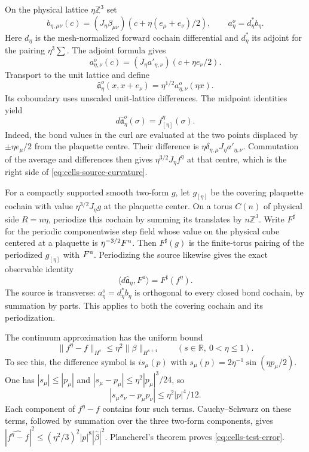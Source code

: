 \documentclass[11pt,letterpaper,reqno]{amsart}
\newcommand{\R}{\mathbb R}
\newcommand{\Z}{\mathbb Z}
\begin{document}
On the physical lattice $\eta\Z^3$ set
\[
 b_{\eta,\mu\nu}(c)
       =(J_\eta\beta_{\mu\nu})
                       (c+\eta(e_\mu+e_\nu)/2),\qquad
 a_\eta^o=d_\eta^*b_\eta.
\]
Here $d_\eta$ is the mesh-normalized forward cochain differential
and $d_\eta^*$ its adjoint for the pairing $\eta^3\sum$.
The adjoint formula gives
\begin{equation}\label{eq:cells-midpoint-source}
 a_{\eta,\nu}^o(c)=(J_\eta a'_{\eta,\nu})(c+\eta e_\nu/2).
\end{equation}
Transport to the unit lattice and define
\[
 \hat{\mathfrak a}_\eta^o(x,x+e_\nu)
                    =\eta^{1/2}a_{\eta,\nu}^o(\eta x).
\]
Its coboundary uses unscaled unit-lattice differences. The
midpoint identities yield
\begin{equation}\label{eq:cells-source-curvature}
 d\hat{\mathfrak a}_\eta^o(\sigma)
                        =f^\eta_{[\eta]}(\sigma).
\end{equation}
Indeed, the bond values in the curl are evaluated at the two
points displaced by $\pm\eta e_\mu/2$ from the plaquette centre.
Their difference is $\eta\delta_{\eta,\mu}J_\eta a'_{\eta,\nu}$.
Commutation of the average and differences then gives
$\eta^{3/2}J_\eta f^\eta$ at that centre, which is the right
side of \eqref{eq:cells-source-curvature}.

For a compactly supported smooth two-form $g$, let $g_{[\eta]}$
be the covering plaquette cochain with value $\eta^{3/2}J_\eta g$
at the plaquette center. On a torus $C(n)$ of physical side
$R=n\eta$, periodize this cochain by summing its translates by
$n\Z^3$. Write $F^\sharp$ for the periodic componentwise step
field whose value on the physical cube centered at a plaquette
is $\eta^{-3/2}F^{\rm u}$. Then $F^\sharp(g)$ is the finite-torus
pairing of the periodized $g_{[\eta]}$ with $F^{\rm u}$.
Periodizing the source likewise gives the exact observable identity
\begin{equation}\label{eq:cells-observable}
 \langle d\hat{\mathfrak a}_\eta,F^{\mathrm u}\rangle
                            =F^\sharp(f^\eta).
\end{equation}
The source is transverse: $a_\eta^o=d_\eta^*b_\eta$ is
orthogonal to every closed bond cochain, by summation by
parts. This applies to both the covering cochain and its
periodization.

The continuum approximation has the uniform bound
\begin{equation}\label{eq:cells-test-error}
 \|f^\eta-f\|_{H^s}\le\eta^2\|\beta\|_{H^{s+4}}
                         \qquad(s\in\R,\ 0<\eta\le1).
\end{equation}
To see this, the difference symbol is
$is_\mu(p)$ with $s_\mu(p)=2\eta^{-1}\sin(\eta p_\mu/2)$.
One has $|s_\mu|\le|p_\mu|$ and
$|s_\mu-p_\mu|\le\eta^2|p_\mu|^3/24$, so
\[
 |s_\mu s_\nu-p_\mu p_\nu|
                               \le\eta^2|p|^4/12.
\]
Each component of $f^\eta-f$ contains four such terms.
Cauchy--Schwarz on these terms, followed by summation over
the three two-form components, gives
$|\widehat{f^\eta-f}|^2\le(\eta^2/3)^2|p|^8|\hat\beta|^2$.
Plancherel's theorem proves \eqref{eq:cells-test-error}.
\end{document}

